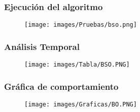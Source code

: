 \documentclass[12pt]{article}
\begin{document}
    		\subsubsection{Ejecución del algoritmo}
        		\begin{figure}[H]
        	            \centering
        	            \texttt{[image: images/Pruebas/bso.png]}
                \end{figure}

    		\subsubsection{Análisis Temporal}
    		    \begin{figure}[H]
        	            \centering
        	             \texttt{[image: images/Tabla/BSO.PNG]}
                \end{figure}
    		\subsubsection{Gráfica de comportamiento}
    		    \begin{figure}[H]
        	            \centering
        	             \texttt{[image: images/Graficas/BO.PNG]}
                \end{figure}
    		\newpage
\end{document}
